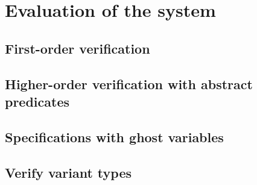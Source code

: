 
\chapter{Evaluation of the system}
\label{ch:evaluation}
\vspace{2em}

\section{First-order verification}

\section{Higher-order verification with abstract predicates}

\section{Specifications with ghost variables}

\section{Verify variant types}